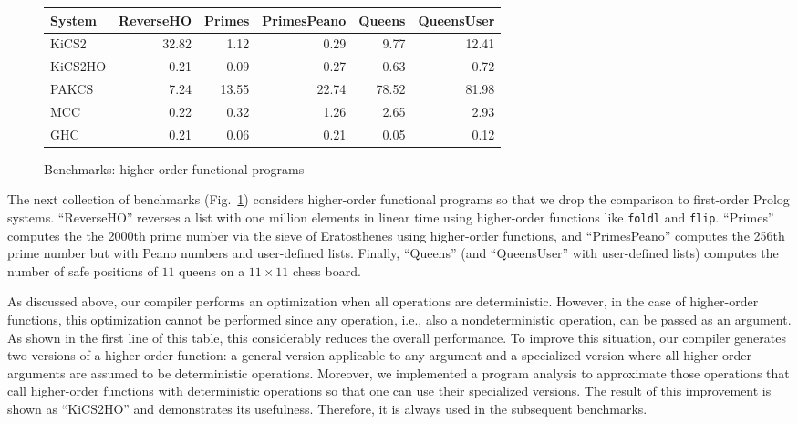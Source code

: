 \documentclass{llncs}
\newcommand{\code}[1]{\mbox{\small\texttt{#1}}}
\begin{document}
\begin{figure}
\centering
\begin{tabular}{|@{~~}l@{~~}|*{5}{@{~~}r@{~~}|}}
\hline
System  & ReverseHO & Primes & PrimesPeano & Queens & QueensUser \\\hline
KiCS2   &     32.82 &   1.12 &        0.29 &   9.77 &     12.41  \\
KiCS2HO &      0.21 &   0.09 &        0.27 &   0.63 &      0.72  \\
PAKCS   &      7.24 &  13.55 &       22.74 &  78.52 &     81.98  \\
MCC     &      0.22 &   0.32 &        1.26 &   2.65 &      2.93  \\
GHC     &      0.21 &   0.06 &        0.21 &   0.05 &      0.12  \\
\hline
\end{tabular}
\caption{Benchmarks: higher-order functional programs}
 \label{fig:bench-higher-order}
\end{figure}
%
The next collection of benchmarks (Fig.~\ref{fig:bench-higher-order})
considers higher-order functional programs so that we drop
the comparison to first-order Prolog systems.
``ReverseHO'' reverses a list with one million
elements in linear time using higher-order functions
like \code{foldl} and \code{flip}.
``Primes'' computes the the 2000th prime number via the
sieve of Eratosthenes using higher-order functions,
and ``PrimesPeano'' computes the 256th prime number but
with Peano numbers and user-defined lists.
Finally, ``Queens'' (and ``QueensUser'' with user-defined lists)
computes the number of safe positions of $11$ queens on a $11 \times 11$
chess board.

As discussed above, our compiler performs an optimization
when all operations are deterministic. However, in the case
of higher-order functions, this optimization cannot be performed
since any operation, i.e., also a nondeterministic operation,
can be passed as an argument. As shown in the first line of this table,
this considerably reduces the overall performance.
To improve this situation, our compiler generates two versions
of a higher-order function: a general version applicable to any
argument and a specialized version where all higher-order arguments
are assumed to be deterministic operations.
Moreover, we implemented a program analysis
to approximate those operations that call higher-order functions
with deterministic operations so that one can use their
specialized versions. The result of this improvement
is shown as ``KiCS2HO'' and demonstrates its usefulness.
Therefore, it is always used in the subsequent benchmarks.
\end{document}
